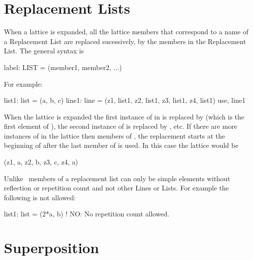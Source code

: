 \section{Replacement Lists}

When a lattice is expanded, all the lattice members that correspond to a 
name of a Replacement List 
are replaced sucessively, by the members
in the Replacement List. The general syntax is
\begin{example}
  label: LIST = (member1, member2, ...)
\end{example}
For example:
\begin{example}
  list1: list = (a, b, c)
  line1: line = (z1, list1, z2, list1, z3, list1, z4, list1)
  use, line1
\end{example}
When the lattice is expanded the first instance of  in
 is replaced by  (which is the first element of
), the second instance of  is replaced by ,
etc. If there are more instances of  in the lattice then
members of , the replacement starts at the beginning of
 after the last member of  is used. In this case the
lattice would be
\begin{example}
  (z1, a, z2, b, z3, c, z4, a)
\end{example}
Unlike \mad\, members of a replacement list can only be simple elements 
without reflection or repetition count and not other Lines or Lists. 
For example the following is not allowed:
\begin{example}
  list1: list = (2*a, b)  ! NO: No repetition count allowed.
\end{example}

\section{Superposition}
\label{s:super}

